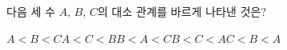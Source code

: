 다음 세 수 $A$, $B$, $C$의 대소 관계를 바르게 나타낸 것은? 
\begin{choices32}{$A<B<C$}{$A<C<B$}{$B<A<C$}{$B<C<A$}{$C<B<A$}\end{choices32}
